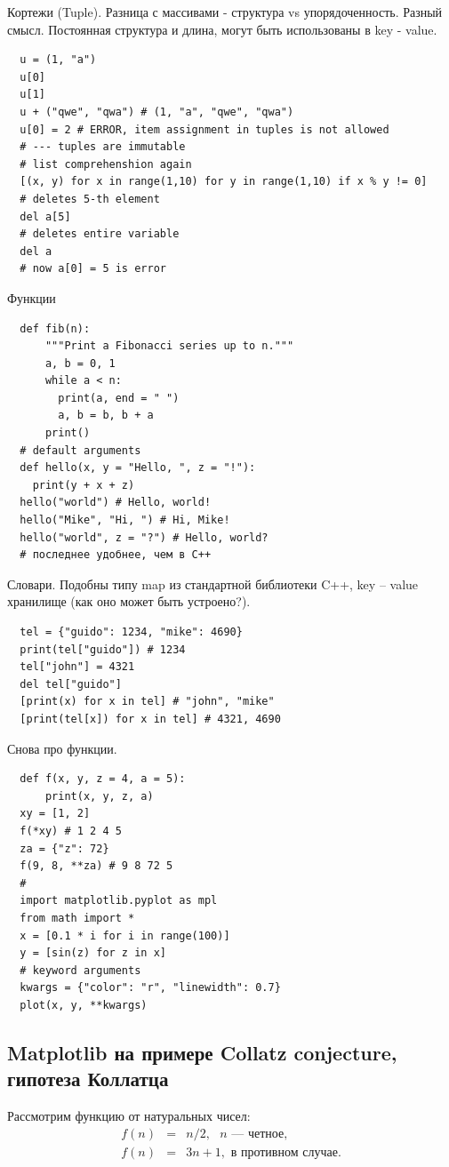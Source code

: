 \documentclass{book}
\begin{document}
Кортежи (Tuple). Разница с массивами - структура vs упорядоченность. Разный смысл. Постоянная
структура и длина, могут быть использованы в key - value.
\begin{verbatim}
  u = (1, "a")
  u[0]
  u[1]
  u + ("qwe", "qwa") # (1, "a", "qwe", "qwa")
  u[0] = 2 # ERROR, item assignment in tuples is not allowed
  # --- tuples are immutable
  # list comprehenshion again
  [(x, y) for x in range(1,10) for y in range(1,10) if x % y != 0]
  # deletes 5-th element
  del a[5]
  # deletes entire variable
  del a
  # now a[0] = 5 is error
\end{verbatim}

Функции
\begin{verbatim}
  def fib(n):
      """Print a Fibonacci series up to n."""
      a, b = 0, 1
      while a < n:
        print(a, end = " ")
        a, b = b, b + a
      print()
  # default arguments
  def hello(x, y = "Hello, ", z = "!"):
    print(y + x + z)
  hello("world") # Hello, world!
  hello("Mike", "Hi, ") # Hi, Mike!
  hello("world", z = "?") # Hello, world?
  # последнее удобнее, чем в C++
\end{verbatim}

Словари. Подобны типу map из стандартной библиотеки C++, key -- value хранилище (как оно может быть
устроено?).
\begin{verbatim}
  tel = {"guido": 1234, "mike": 4690}
  print(tel["guido"]) # 1234
  tel["john"] = 4321
  del tel["guido"]
  [print(x) for x in tel] # "john", "mike"
  [print(tel[x]) for x in tel] # 4321, 4690
\end{verbatim}

Снова про функции.
\begin{verbatim}
  def f(x, y, z = 4, a = 5):
      print(x, y, z, a)
  xy = [1, 2]
  f(*xy) # 1 2 4 5
  za = {"z": 72}
  f(9, 8, **za) # 9 8 72 5
  #
  import matplotlib.pyplot as mpl
  from math import *
  x = [0.1 * i for i in range(100)]
  y = [sin(z) for z in x]
  # keyword arguments
  kwargs = {"color": "r", "linewidth": 0.7}
  plot(x, y, **kwargs)
\end{verbatim}

\subsection{Matplotlib на примере Collatz conjecture, гипотеза Коллатца}

Рассмотрим функцию от натуральных чисел:
\begin{eqnarray}
    f(n) & = & n / 2, \text{ $n$ --- четное}, \\
    f(n) & = & 3 n + 1, \text{ в противном случае}.
\end{eqnarray}
\end{document}

